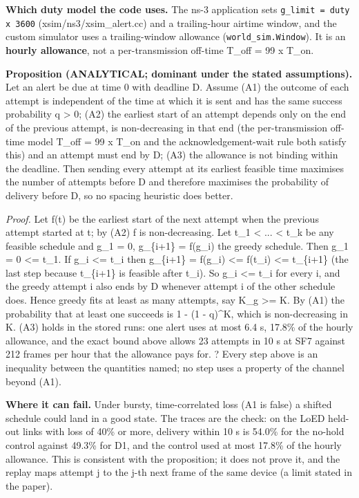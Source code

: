 \textbf{Which duty model the code uses.} The ns-3 application sets \texttt{g\_limit = duty x 3600} (xsim/ns3/xsim\_alert.cc) and a trailing-hour airtime window, and the custom simulator uses a trailing-window allowance (\texttt{world\_sim.Window}). It is an \textbf{hourly allowance}, not a per-transmission off-time T\_off = 99 x T\_on.

\textbf{Proposition (ANALYTICAL; dominant under the stated assumptions).} Let an alert be due at time 0 with deadline D. Assume (A1) the outcome of each attempt is independent of the time at which it is sent and has the same success probability q > 0; (A2) the earliest start of an attempt depends only on the end of the previous attempt, is non-decreasing in that end (the per-transmission off-time model T\_off = 99 x T\_on and the acknowledgement-wait rule both satisfy this) and an attempt must end by D; (A3) the allowance is not binding within the deadline. Then sending every attempt at its earliest feasible time maximises the number of attempts before D and therefore maximises the probability of delivery before D, so no spacing heuristic does better.

\emph{Proof.} Let f(t) be the earliest start of the next attempt when the previous attempt started at t; by (A2) f is non-decreasing. Let t\_1 < ... < t\_k be any feasible schedule and g\_1 = 0, g\_\{i+1\} = f(g\_i) the greedy schedule. Then g\_1 = 0 <= t\_1. If g\_i <= t\_i then g\_\{i+1\} = f(g\_i) <= f(t\_i) <= t\_\{i+1\} (the last step because t\_\{i+1\} is feasible after t\_i). So g\_i <= t\_i for every i, and the greedy attempt i also ends by D whenever attempt i of the other schedule does. Hence greedy fits at least as many attempts, say K\_g >= K. By (A1) the probability that at least one succeeds is 1 - (1 - q)\textasciicircum{}K, which is non-decreasing in K. (A3) holds in the stored runs: one alert uses at most 6.4 s, 17.8\% of the hourly allowance, and the exact bound above allows 23 attempts in 10 s at SF7 against 212 frames per hour that the allowance pays for. ? Every step above is an inequality between the quantities named; no step uses a property of the channel beyond (A1).

\textbf{Where it can fail.} Under bursty, time-correlated loss (A1 is false) a shifted schedule could land in a good state. The traces are the check: on the LoED held-out links with loss of 40\% or more, delivery within 10 s is 54.0\% for the no-hold control against 49.3\% for D1, and the control used at most 17.8\% of the hourly allowance. This is consistent with the proposition; it does not prove it, and the replay maps attempt j to the j-th next frame of the same device (a limit stated in the paper).

